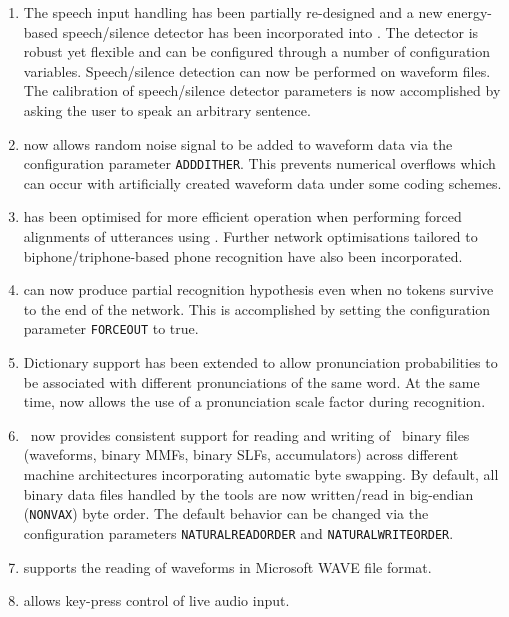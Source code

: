 \begin{enumerate}

\item The speech input handling has been partially re-designed and a new 
energy-based speech/silence detector has been incorporated into .
The detector is robust yet flexible and can be configured through a number of
configuration variables. Speech/silence detection can now be performed on
waveform files. The calibration of speech/silence detector parameters is now
accomplished by asking the user to speak an arbitrary sentence.

\item {} now allows random noise signal to be added to waveform
data via the configuration parameter \texttt{ADDDITHER}. This prevents
numerical overflows which can occur with artificially created waveform data
under some coding schemes.

\item {} has been optimised for more efficient operation when
performing forced alignments of utterances using . Further
network optimisations tailored to biphone/triphone-based phone recognition 
have also been incorporated.

\item {} can now produce partial recognition hypothesis even when 
no tokens survive to the end of the network. This is accomplished by setting
the  configuration parameter \texttt{FORCEOUT} to true.

\item Dictionary support has been extended to allow pronunciation probabilities
to be associated with different pronunciations of the same word. At the same
time,  now allows the use of a pronunciation scale factor during
recognition.

\item \HTK\ now provides consistent support for reading and writing of \HTK\ 
binary files (waveforms, binary MMFs, binary SLFs,  accumulators)
across different machine architectures incorporating automatic byte swapping.
By default, all binary data files handled by the tools are now written/read in
big-endian (\texttt{NONVAX}) byte order. The default behavior can be changed
via the configuration parameters \texttt{NATURALREADORDER} and
\texttt{NATURALWRITEORDER}.

\item {} supports the reading of waveforms in Microsoft WAVE file
format.

\item {} allows key-press control of live audio input.

\end{enumerate}


